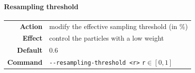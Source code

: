         \paragraph*{Resampling threshold}
            \begin{center}
                \begin{tabular}{rl}
                    \textbf{Action}  & modify the effective sampling threshold (in \%)\\
                    \textbf{Effect}  & control the particles with a low weight\\
                    \textbf{Default} & 0.6\\
                    \textbf{Command} & \texttt{-\hspace{0.1mm}-resampling-threshold <r>} \hfill \texttt{r}$\in[0,1]$
                \end{tabular}
            \end{center}

